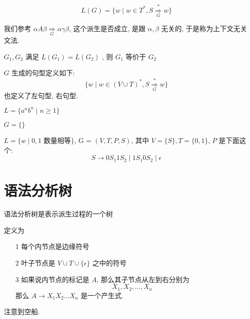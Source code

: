 \documentclass[../main.tex]{subfiles}
\begin{document}
\begin{definition}[语言]
\begin{equation}
	L (G) =  \{ w \mid w \in T ^{*} , S \overset{*}{\underset{G}{\Rightarrow}} w \}
\end{equation}
\end{definition}

\begin{remark}[为什么称为是上下文无关文法]
	我们参考 \(\alpha A\beta \underset{G}{\Rightarrow}\alpha\gamma\beta\), 这个派生是否成立, 是跟 \(\alpha ,\beta\) 无关的, 于是称为上下文无关文法.
\end{remark}

\begin{definition}[等价性]
	\(G_{1} , G_{2}\) 满足 \(L (G _{1} )  =  L (G _{2} ) \) , 则 \(G_{1} \) 等价于 \(G_{2}\)
\end{definition}

\begin{definition}
	\(G\) 生成的句型定义如下: 
	\begin{equation}
		\{ w \mid w \in (V \cup T ) ^{*} , S \overset{*}{\underset{G}{\Rightarrow}} w \}
	\end{equation}
	也定义了左句型, 右句型.
\end{definition}


\begin{exam}
	\(L  = \{ a ^{n} b ^{n}\mid n \ge 1 \}\)
\end{exam}
\begin{exam}
	\(G = \{ \}\)
\end{exam}
\begin{exam}
	\(L = \{  w \mid 0,  1 \text{ 数量相等}\}\), G = \((V, T , P , S)\), 其中 \(V = \{ S \}, T = \{ 0 ,1 \}\), \(P \) 是下面这个:
	\[
	S \to 0S_{1} 1 S_{2} \mid 1 S_{1} 0 S_{2}  \mid \epsilon 
\]
\end{exam}

\begin{exam}[算术表达式]
\end{exam}


\section{语法分析树}\label{sec:tree}

语法分析树是表示派生过程的一个树

\begin{definition}[分析树]\label{def:分析树}
定义为 
\begin{itemize}
\item [1] 
 每个内节点是边缘符号
\item [2] 
叶子节点是 \(V \cup T \cup \{ \epsilon \} \) 之中的符号 
\item [3] 
如果说内节点的标记是 \(A\), 那么其子节点从左到右分别为
\[
X_{1} , X _{2}, \dots , X _{n}
\]
那么 \(A \to X _{1} X _{2}\dots  X_{n}\) 是一个产生式. 
\end{itemize}
注意到空船. 
\end{definition}
\end{document}
